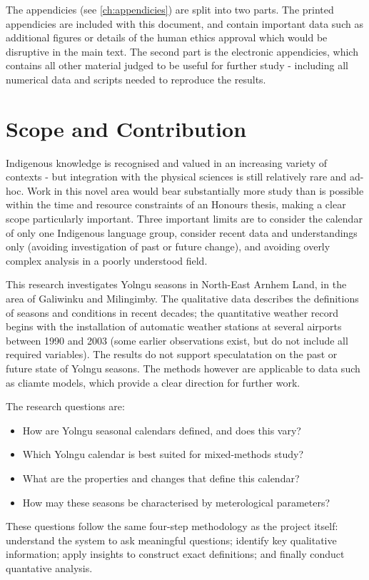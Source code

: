 The appendicies (see \cref{ch:appendicies}) are split into two parts.
The printed appendicies are included with this document, and contain
important data such as additional figures or details of the human ethics
approval which would be disruptive in the main text.  The second part
is the electronic appendicies, which contains all other material judged to
be useful for further study - including all numerical data and scripts
needed to reproduce the results.



\section{Scope and Contribution}
Indigenous knowledge is recognised and valued in an increasing variety
of contexts \citep[eg.][]{petheram2010,cochran2015,berkes2012} -
but integration with the physical sciences is still relatively rare and
ad-hoc.  Work in this novel area would bear substantially more study than
is possible within the time and resource constraints of an Honours thesis,
making a clear scope particularly important.
%
Three important limits are to consider the calendar of only one Indigenous
language group, consider recent data and understandings only (avoiding
investigation of past or future change), and avoiding overly complex
analysis in a poorly understood field.

This research investigates Yolngu seasons in North-East Arnhem Land, in
the area of Galiwinku and Milingimby.  The qualitative data describes the
definitions of seasons and conditions in recent decades; the quantitative
weather record begins with the installation of automatic weather stations
at several airports between 1990 and 2003  (some earlier observations exist,
but do not include all required variables).  The results do not support
speculatation on the past or future state of Yolngu seasons.  The methods
however are applicable to data such as cliamte models, which provide
a clear direction for further work.

The research questions are:
\begin{itemize}
\item How are Yolngu seasonal calendars defined, and does this vary?
\item Which Yolngu calendar is best suited for mixed-methods study?
\item What are the properties and changes that define this calendar?
\item How may these seasons be characterised by meterological parameters?
\end{itemize}
These questions follow the same four-step methodology as the project itself:
understand the system to ask meaningful questions; identify key
qualitative information; apply insights to construct exact definitions; and
finally conduct quantative analysis.


